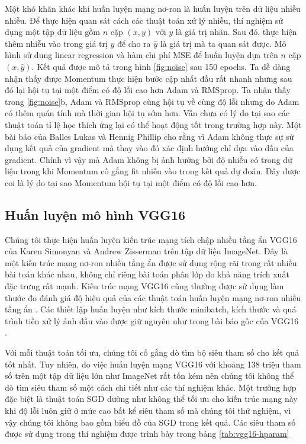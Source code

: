 Một khó khăn khác khi huấn luyện mạng nơ-ron là huấn luyện trên dữ liệu nhiều nhiễu. Để thực hiện quan sát cách các thuật toán xử lý nhiễu, thí nghiệm sử dụng một tập dữ liệu gồm $n$ cặp $(x,y)$ với $y$ là giá trị nhãn. Sau đó, thực hiện thêm nhiễu vào trong giá trị $y$ để cho ra $\hat y$ là giá trị mà ta quan sát được. Mô hình sử dụng linear regression và hàm chi phí MSE để huấn luyện dựa trên $n$ cặp $(x,\hat y)$. Kết quả được mô tả trong hình \ref{fig:noise} sau 150 epochs. Ta dễ dàng nhận thấy được Momentum thực hiện bước cập nhất đầu rất nhanh nhưng sau đó lại hội tụ tại một điểm có độ lỗi cao hơn Adam và RMSprop. Ta nhận thấy trong \ref{fig:noise}b, Adam và RMSprop cùng hội tụ về cùng độ lỗi nhưng do Adam có thêm quán tính mà thời gian hội tụ sớm hơn. Vẫn chưa có lý do tại sao các thuật toán tỉ lệ học thích ứng lại có thể hoạt động tốt trong trường hợp này. Một bài báo của Balles Lukas và Hennig Phillip \cite{balles2018dissecting} cho rằng vì Adam không thực sự sử dụng kết quả của gradient mà thay vào đó xác định hướng chỉ dựa vào dấu của gradient. Chính vì vậy mà Adam không bị ảnh hưởng bởi độ nhiễu có trong dữ liệu trong khi Momentum cố gắng fit nhiễu vào trong kết quả dự đoán. Đây được coi là lý do tại sao Momentum hội tụ tại một điểm có độ lỗi cao hơn.

\subsection{Huấn luyện mô hình VGG16}
\label{exp:vgg16}

Chúng tôi thực hiện huấn luyện kiến trúc mạng tích chập nhiều tầng ẩn VGG16 của Karen Simonyan và Andrew Zisserman \cite{simonyan2014verydeep} trên tập dữ liệu ImageNet. Đây là một kiến trúc mạng nơ-ron nhiều tầng ẩn được sử dụng rộng rãi trong rất nhiều bài toán khác nhau, không chỉ riêng bài toán phân lớp do khả năng trích xuất đặc trưng rất mạnh. Kiến trúc mạng VGG16 cũng thường được sử dụng làm thước đo đánh giá độ hiệu quả của các thuật toán huấn luyện mạng nơ-ron nhiều tầng ẩn \cite{zhuang2020adabelief} \cite{schneider2018deepobs}. Các thiết lập huấn luyện như kích thước minibatch, kích thước và quá trình tiền xử lý ảnh đầu vào được giữ nguyên như trong bài báo gốc của VGG16 \cite{simonyan2014verydeep}.

Với mỗi thuật toán tối ưu, chúng tôi cố gắng dò tìm bộ siêu tham số cho kết quả tốt nhất. Tuy nhiên, do việc huấn luyện mạng VGG16 với khoảng 138 triệu tham số trên một tập dữ liệu lớn như ImageNet rất tốn kém nên chúng tôi không thể dò tìm siêu tham số một cách chi tiết như các thí nghiệm khác. Một trường hợp đặc biệt là thuật toán SGD dường như không thể tối ưu cho kiến trúc mạng này khi độ lỗi luôn giữ ở mức cao bất kể siêu tham số mà chúng tôi thử nghiệm, vì vậy chúng tôi không bao gồm biểu đồ của SGD trong kết quả. Các siêu tham số được sử dụng trong thí nghiệm được trình bày trong bảng \ref{tab:vgg16-hparam}

